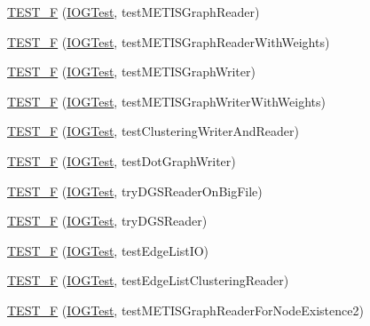 \begin{DoxyCompactItemize}
\item 
\hyperlink{namespace_networ_kit_a9e5db64c16de329c06d804f15fcdb1c2}{T\-E\-S\-T\-\_\-\-F} (\hyperlink{class_networ_kit_1_1_i_o_g_test}{I\-O\-G\-Test}, test\-M\-E\-T\-I\-S\-Graph\-Reader)
\item 
\hyperlink{namespace_networ_kit_a7ef52eb16bb867d19a83a69f3f02ed01}{T\-E\-S\-T\-\_\-\-F} (\hyperlink{class_networ_kit_1_1_i_o_g_test}{I\-O\-G\-Test}, test\-M\-E\-T\-I\-S\-Graph\-Reader\-With\-Weights)
\item 
\hyperlink{namespace_networ_kit_a1a39d73b85bfb6e441a56f1fc10ffdbc}{T\-E\-S\-T\-\_\-\-F} (\hyperlink{class_networ_kit_1_1_i_o_g_test}{I\-O\-G\-Test}, test\-M\-E\-T\-I\-S\-Graph\-Writer)
\item 
\hyperlink{namespace_networ_kit_ae948ca68f9ae35ed9b67908e62f1ddd0}{T\-E\-S\-T\-\_\-\-F} (\hyperlink{class_networ_kit_1_1_i_o_g_test}{I\-O\-G\-Test}, test\-M\-E\-T\-I\-S\-Graph\-Writer\-With\-Weights)
\item 
\hyperlink{namespace_networ_kit_aadccdd9ebc4663940765397c370ef426}{T\-E\-S\-T\-\_\-\-F} (\hyperlink{class_networ_kit_1_1_i_o_g_test}{I\-O\-G\-Test}, test\-Clustering\-Writer\-And\-Reader)
\item 
\hyperlink{namespace_networ_kit_aaa882c8356abf211a4527cc17d50dcb9}{T\-E\-S\-T\-\_\-\-F} (\hyperlink{class_networ_kit_1_1_i_o_g_test}{I\-O\-G\-Test}, test\-Dot\-Graph\-Writer)
\item 
\hyperlink{namespace_networ_kit_a944c1c6c4157e8c1b0652972422d1536}{T\-E\-S\-T\-\_\-\-F} (\hyperlink{class_networ_kit_1_1_i_o_g_test}{I\-O\-G\-Test}, try\-D\-G\-S\-Reader\-On\-Big\-File)
\item 
\hyperlink{namespace_networ_kit_ab20865ee1759d0857b5ea07f3c45b0bc}{T\-E\-S\-T\-\_\-\-F} (\hyperlink{class_networ_kit_1_1_i_o_g_test}{I\-O\-G\-Test}, try\-D\-G\-S\-Reader)
\item 
\hyperlink{namespace_networ_kit_ace257ce4c1dfbfad290946a4b3e75442}{T\-E\-S\-T\-\_\-\-F} (\hyperlink{class_networ_kit_1_1_i_o_g_test}{I\-O\-G\-Test}, test\-Edge\-List\-I\-O)
\item 
\hyperlink{namespace_networ_kit_acc770aa5ad1242c8d5a03a4825dd55b3}{T\-E\-S\-T\-\_\-\-F} (\hyperlink{class_networ_kit_1_1_i_o_g_test}{I\-O\-G\-Test}, test\-Edge\-List\-Clustering\-Reader)
\item 
\hyperlink{namespace_networ_kit_aac3c5ff6cbdecf98bde5fc8125dfec74}{T\-E\-S\-T\-\_\-\-F} (\hyperlink{class_networ_kit_1_1_i_o_g_test}{I\-O\-G\-Test}, test\-M\-E\-T\-I\-S\-Graph\-Reader\-For\-Node\-Existence2)
\item 

\end{DoxyCompactItemize}

